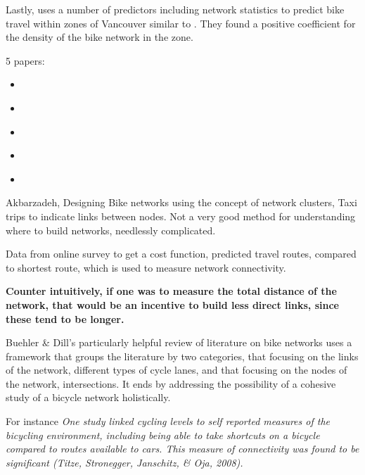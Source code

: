 \documentclass[11pt]{article} %
\begin{document}
Lastly, \cite{osama2017models} uses a number of predictors including network statistics to predict bike travel within zones of Vancouver similar to \cite{schoner2014missing}. They found a positive coefficient for the density of the bike network in the zone. 

5 papers:
\begin{itemize}

\item \cite{boisjoly2019bicycle}
\item \cite{akbarzadeh2018designing}
\item \cite{doorley2019designing}
\item \cite{mauttone2017bicycle}
\item \cite{osama2017models}

\end{itemize}






Akbarzadeh, Designing Bike networks using the concept of network clusters, Taxi trips to indicate links between nodes. Not a very good method for understanding where to build networks, needlessly complicated. \cite{akbarzadeh2018designing}


Data from online survey to get a cost function, predicted travel routes, compared to shortest route, which is used to measure network connectivity. 

\textbf{
Counter intuitively, if one was to measure the total distance of the network, that would be an incentive to build less direct links, since these tend to be longer.}  
\cite{boisjoly2019bicycle} 

Buehler \& Dill's  particularly helpful review of literature on bike networks uses a framework that groups the literature by two categories, that focusing on the links of the network, different types of cycle lanes, and that focusing on the nodes of the network, intersections. It ends by addressing the possibility of a cohesive study of a bicycle network holistically.

	For instance \textit{One study linked cycling levels to self reported measures of the bicycling environment, including being able to take shortcuts on a bicycle compared to routes available to cars. This measure of connectivity was found to be significant (Titze, Stronegger, Janschitz, \& Oja, 2008).}
	
\end{document}
